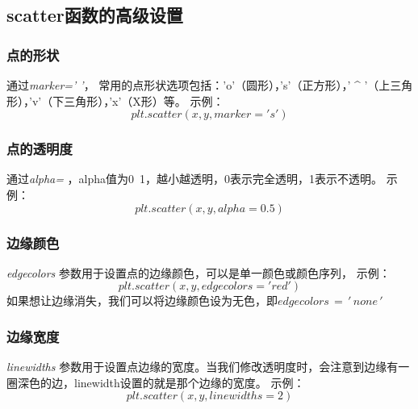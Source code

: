\documentclass[12pt]{article}
\begin{document}
\subsection{scatter函数的高级设置}\label{scatter函数的高级设置}

\subsubsection{点的形状}
通过\textit{marker=' '}， 常用的点形状选项包括：'o'（圆形），'s'（正方形），' \^{} '（上三角形），'v'（下三角形），'x'（X形）等。
示例：\[plt.scatter(x, y, marker='s')\]
\subsubsection{点的透明度}
通过\textit{alpha= }，alpha值为0~1，越小越透明，0表示完全透明，1表示不透明。
示例：\[  plt.scatter(x, y, alpha=0.5)\]
\subsubsection{边缘颜色}
\textit{edgecolors} 参数用于设置点的边缘颜色，可以是单一颜色或颜色序列，
示例：\[plt.scatter(x, y, edgecolors='red') \]
如果想让边缘消失，我们可以将边缘颜色设为无色，即\(edgecolors\,=\,'\,none\,'\)
\subsubsection{边缘宽度}
\textit{linewidths} 参数用于设置点边缘的宽度。当我们修改透明度时，会注意到边缘有一圈深色的边，linewidth设置的就是那个边缘的宽度。
示例：\[plt.scatter(x, y, linewidths=2)\]
\end{document}
